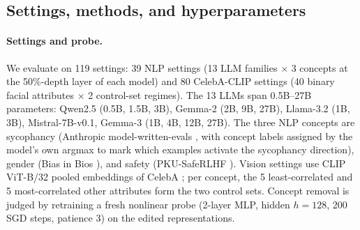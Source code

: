\subsection{Settings, methods, and hyperparameters}
\label{sec:hp_selection}

\paragraph{Settings and probe.} We evaluate on 119 settings: 39 NLP settings (13 LLM families $\times$ 3 concepts at the 50\%-depth layer of each model) and 80 CelebA-CLIP settings (40 binary facial attributes $\times$ 2 control-set regimes). The 13 LLMs span 0.5B–27B parameters: Qwen2.5 (0.5B, 1.5B, 3B), Gemma-2 (2B, 9B, 27B), Llama-3.2 (1B, 3B), Mistral-7B-v0.1, Gemma-3 (1B, 4B, 12B, 27B). The three NLP concepts are sycophancy (Anthropic model-written-evals \citep{perez-etal-2022-model-written}, with concept labels assigned by the model's own argmax to mark which examples activate the sycophancy direction), gender (Bias in Bios \citep{dearteaga-etal-2019-bias}), and safety (PKU-SafeRLHF \citep{ji-etal-2025-pku-saferlhf}). Vision settings use CLIP ViT-B/32 \citep{radford-etal-2021-clip} pooled embeddings of CelebA \citep{liu-etal-2015-celeba}; per concept, the 5 least-correlated and 5 most-correlated other attributes form the two control sets. Concept removal is judged by retraining a fresh nonlinear probe (2-layer MLP, hidden $h=128$, 200 SGD steps, patience 3) on the edited representations.

